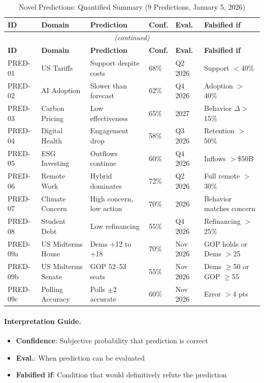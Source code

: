 \begin{longtable}{p{1.8cm}p{3.5cm}p{3cm}p{1.5cm}p{1.8cm}p{2.5cm}}
\caption{Novel Predictions: Quantified Summary (9 Predictions, January 5, 2026)} \\
\toprule
\textbf{ID} & \textbf{Domain} & \textbf{Prediction} & \textbf{Conf.} & \textbf{Eval.} & \textbf{Falsified if} \\
\midrule
\endfirsthead
\multicolumn{6}{c}{\textit{(continued)}} \\
\toprule
\textbf{ID} & \textbf{Domain} & \textbf{Prediction} & \textbf{Conf.} & \textbf{Eval.} & \textbf{Falsified if} \\
\midrule
\endhead
\bottomrule
\endfoot

PRED-01 & US Tariffs & Support despite costs & 68\% & Q2 2026 & Support $<$40\% \\
PRED-02 & AI Adoption & Slower than forecast & 62\% & Q4 2026 & Adoption $>$40\% \\
PRED-03 & Carbon Pricing & Low effectiveness & 65\% & 2027 & Behavior $\Delta >$15\% \\
PRED-04 & Digital Health & Engagement drop & 58\% & Q3 2026 & Retention $>$50\% \\
PRED-05 & ESG Investing & Outflows continue & 60\% & Q4 2026 & Inflows $>$\$50B \\
PRED-06 & Remote Work & Hybrid dominates & 72\% & Q2 2026 & Full remote $>$30\% \\
PRED-07 & Climate Concern & High concern, low action & 70\% & 2026 & Behavior matches concern \\
PRED-08 & Student Debt & Low refinancing & 55\% & Q4 2026 & Refinancing $>$25\% \\
\midrule
PRED-09a & US Midterms House & Dems +12 to +18 & 70\% & Nov 2026 & GOP holds or Dems $>$25 \\
PRED-09b & US Midterms Senate & GOP 52--53 seats & 55\% & Nov 2026 & Dems $\geq$50 or GOP $\geq$55 \\
PRED-09c & Polling Accuracy & Polls $\pm$2 accurate & 60\% & Nov 2026 & Error $>$4 pts \\

\end{longtable}

\paragraph{Interpretation Guide.}
\begin{itemize}
    \item \textbf{Confidence}: Subjective probability that prediction is correct
    \item \textbf{Eval.}: When prediction can be evaluated
    \item \textbf{Falsified if}: Condition that would definitively refute the prediction
\end{itemize}

